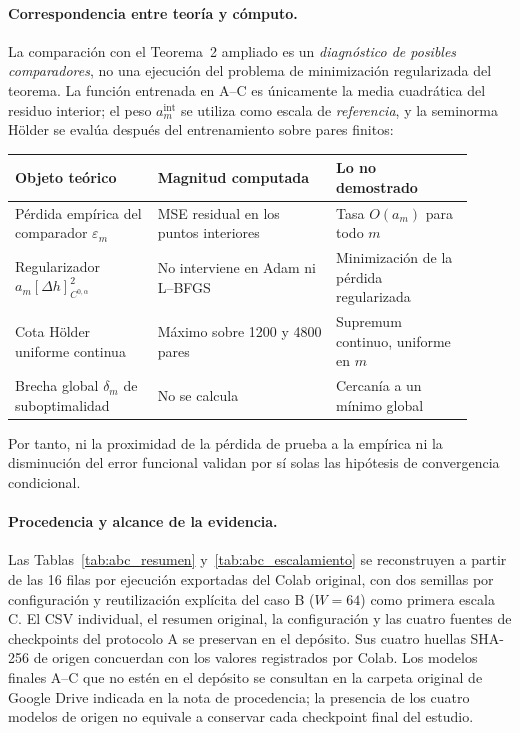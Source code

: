 \paragraph{Correspondencia entre teoría y cómputo.}
La comparación con el Teorema~2 ampliado es un \emph{diagnóstico de
posibles comparadores}, no una ejecución del problema de minimización
regularizada del teorema. La función entrenada en A--C es únicamente
la media cuadrática del residuo interior; el peso $a_m^{\mathrm{int}}$
se utiliza como escala de \emph{referencia}, y la seminorma H\"older
se evalúa después del entrenamiento sobre pares finitos:
\begin{center}
\small
\begin{tabular}{p{0.29\linewidth}p{0.35\linewidth}p{0.27\linewidth}}
\hline
\textbf{Objeto teórico} & \textbf{Magnitud computada} & \textbf{Lo no demostrado} \\
\hline
Pérdida empírica del comparador $\varepsilon_m$
 & MSE residual en los puntos interiores & Tasa $O(a_m)$ para todo $m$ \\
Regularizador $a_m[\Delta h]_{C^{0,\alpha}}^2$
 & No interviene en Adam ni L--BFGS & Minimización de la pérdida regularizada \\
Cota H\"older uniforme continua
 & Máximo sobre 1200 y 4800 pares & Supremum continuo, uniforme en $m$ \\
Brecha global $\delta_m$ de suboptimalidad
 & No se calcula & Cercanía a un mínimo global \\
\hline
\end{tabular}
\end{center}
Por tanto, ni la proximidad de la pérdida de prueba a la empírica
ni la disminución del error funcional validan por sí solas las hipótesis
de convergencia condicional.

\paragraph{Procedencia y alcance de la evidencia.}
Las Tablas~\ref{tab:abc_resumen} y~\ref{tab:abc_escalamiento} se
reconstruyen a partir de las 16 filas por ejecución exportadas del
Colab original, con dos semillas por configuración y reutilización
explícita del caso B ($W=64$) como primera escala C. El CSV individual,
el resumen original, la configuración y las cuatro fuentes de
checkpoints del protocolo A se preservan en el depósito. Sus cuatro
huellas SHA-256 de origen concuerdan con los valores registrados por
Colab. Los modelos finales A--C que no estén en el depósito se consultan
en la carpeta original de Google Drive indicada en la nota de procedencia;
la presencia de los cuatro modelos de origen no equivale a conservar
cada checkpoint final del estudio.

